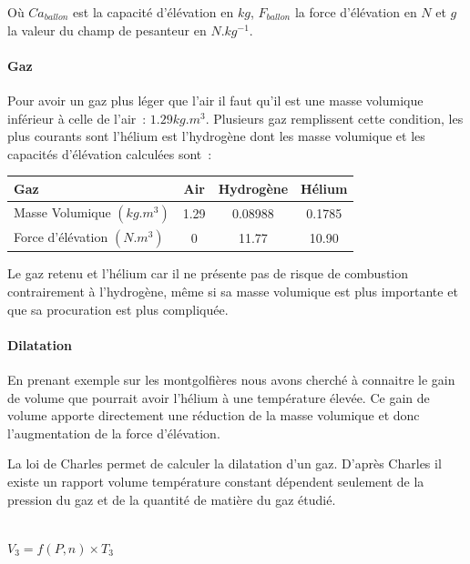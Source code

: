 \documentclass[a4paper,11pt]{article}
\begin{document}
Où $Ca_{ballon}$ est la capacité d'élévation en $kg$, $F_{ballon}$ la force d'élévation en $N$ et $g$ la valeur du champ de pesanteur en $N.kg^{-1}$.

\paragraph{Gaz}

Pour avoir un gaz plus léger que l'air il faut qu'il est une masse volumique inférieur à celle de l'air~: $1.29kg.m^3$. Plusieurs gaz remplissent cette condition, les plus courants sont l'hélium est l'hydrogène dont les masse volumique et les capacités d'élévation calculées sont~:

\begin{center}
	\begin{tabular}{|l|c|c|c|}
		\hline
		Gaz & Air & Hydrogène & Hélium \\
		\hline
		Masse Volumique $(kg.m^3)$ & 1.29 & 0.08988 & 0.1785 \\
		\hline
		Force d'élévation $(N.m^3)$ & 0 & 11.77 & 10.90 \\
		\hline
	\end{tabular}
\end{center}

Le gaz retenu et l'hélium car il ne présente pas de risque de combustion contrairement à l'hydrogène, même si sa masse volumique est plus importante et que sa procuration est plus compliquée.

\paragraph{Dilatation}

En prenant exemple sur les montgolfières nous avons cherché à connaitre le gain de volume que pourrait avoir l'hélium à une température élevée. Ce gain de volume apporte directement une réduction de la masse volumique et donc l'augmentation de la force d'élévation.

La loi de Charles permet de calculer la dilatation d'un gaz. D'après Charles il existe un rapport volume température constant dépendent seulement de la pression du gaz et de la quantité de matière du gaz étudié.

\begin{center}
  \\
 $\displaystyle{V_3 = f(P, n) \times T_3}$
\end{center}
\end{document}

